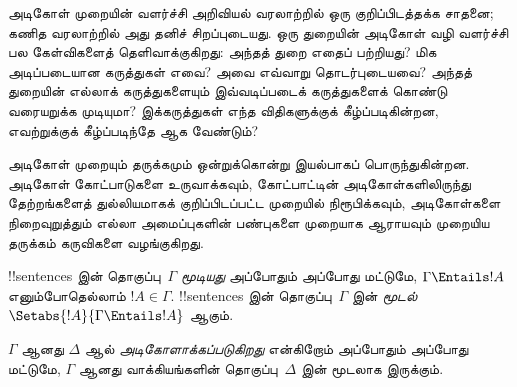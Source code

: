 \documentclass[../../../include/open-logic-section]{subfiles}
\begin{document}


\begin{explain}
அடிகோள் முறையின் வளர்ச்சி அறிவியல் வரலாற்றில் ஒரு குறிப்பிடத்தக்க
சாதனை; கணித வரலாற்றில் அது தனிச் சிறப்புடையது. ஒரு துறையின் அடிகோள்
வழி வளர்ச்சி பல கேள்விகளைத் தெளிவாக்குகிறது: அந்தத் துறை எதைப்
பற்றியது? மிக அடிப்படையான கருத்துகள் எவை? அவை எவ்வாறு தொடர்புடையவை?
அந்தத் துறையின் எல்லாக் கருத்துகளையும் இவ்வடிப்படைக் கருத்துகளைக் கொண்டு
வரையறுக்க முடியுமா? இக்கருத்துகள் எந்த விதிகளுக்குக் கீழ்ப்படிகின்றன,
எவற்றுக்குக் கீழ்ப்படிந்தே ஆக வேண்டும்?

அடிகோள் முறையும் தருக்கமும் ஒன்றுக்கொன்று இயல்பாகப் பொருந்துகின்றன.
அடிகோள் கோட்பாடுகளை உருவாக்கவும், கோட்பாட்டின் அடிகோள்களிலிருந்து
தேற்றங்களைத் துல்லியமாகக் குறிப்பிடப்பட்ட முறையில் நிரூபிக்கவும்,
அடிகோள்களை நிறைவுறுத்தும் எல்லா அமைப்புகளின் பண்புகளை முறையாக
ஆராயவும் முறையிய தருக்கம் கருவிகளை வழங்குகிறது.
\end{explain}

\begin{defn}
!!{sentence}s இன் தொகுப்பு~$\Gamma$ \emph{மூடியது} அப்போதும் அப்போது மட்டுமே,
$\Gamma \Entails !A$ எனும்போதெல்லாம் $!A \in \Gamma$.
!!{sentence}s இன் தொகுப்பு~$\Gamma$ இன் \emph{மூடல்}
$\Setabs{!A}{\Gamma \Entails !A}$ ஆகும்.

$\Gamma$ ஆனது $\Delta$ ஆல் \emph{அடிகோளாக்கப்படுகிறது} என்கிறோம் அப்போதும் அப்போது மட்டுமே,
$\Gamma$ ஆனது வாக்கியங்களின் தொகுப்பு~$\Delta$ இன் மூடலாக இருக்கும்.
\end{defn}
\end{document}
